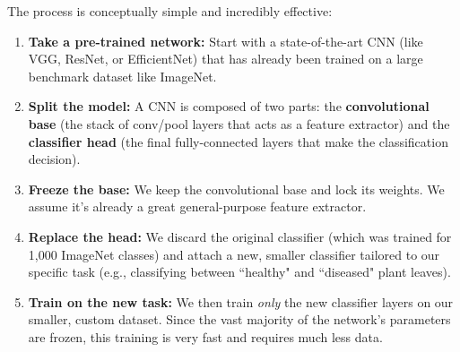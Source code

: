 \documentclass{article}
\begin{document}
\begin{tcolorbox}[colback=blue!5!white, colframe=blue!50!black, title=The Transfer Learning Recipe]
The process is conceptually simple and incredibly effective:
\begin{enumerate}
    \item \textbf{Take a pre-trained network:} Start with a state-of-the-art CNN (like VGG, ResNet, or EfficientNet) that has already been trained on a large benchmark dataset like ImageNet.
    \item \textbf{Split the model:} A CNN is composed of two parts: the \textbf{convolutional base} (the stack of conv/pool layers that acts as a feature extractor) and the \textbf{classifier head} (the final fully-connected layers that make the classification decision).
    \item \textbf{Freeze the base:} We keep the convolutional base and lock its weights. We assume it's already a great general-purpose feature extractor.
    \item \textbf{Replace the head:} We discard the original classifier (which was trained for 1,000 ImageNet classes) and attach a new, smaller classifier tailored to our specific task (e.g., classifying between ``healthy" and ``diseased" plant leaves).
    \item \textbf{Train on the new task:} We then train \textit{only} the new classifier layers on our smaller, custom dataset. Since the vast majority of the network's parameters are frozen, this training is very fast and requires much less data.
\end{enumerate}
\end{tcolorbox}
\end{document}
